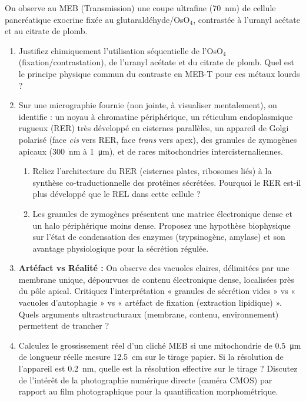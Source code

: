 \documentclass[11pt]{article}
\begin{document}
\begin{exercice}
On observe au MEB (Transmission) une coupe ultrafine (\SI{70}{nm}) de cellule pancréatique exocrine fixée au glutaraldéhyde/OsO$_4$, contrastée à l'uranyl acétate et au citrate de plomb.

\begin{enumerate}
    \item Justifiez chimiquement l'utilisation séquentielle de l'OsO$_4$ (fixation/contrastation), de l'uranyl acétate et du citrate de plomb. Quel est le principe physique commun du contraste en MEB-T pour ces métaux lourds ?
    \item Sur une micrographie fournie (non jointe, à visualiser mentalement), on identifie : un noyau à chromatine périphérique, un réticulum endoplasmique rugueux (RER) très développé en cisternes parallèles, un appareil de Golgi polarisé (face \textit{cis} vers RER, face \textit{trans} vers apex), des granules de zymogènes apicaux (\SI{300}{\nano\meter} à \SI{1}{\micro\meter}), et de rares mitochondries intercisternaliennes.
    \begin{enumerate}
        \item Reliez l'architecture du RER (cisternes plates, ribosomes liés) à la synthèse co-traductionnelle des protéines sécrétées. Pourquoi le RER est-il plus développé que le REL dans cette cellule ?
        \item Les granules de zymogènes présentent une matrice électronique dense et un halo périphérique moins dense. Proposez une hypothèse biophysique sur l'état de condensation des enzymes (trypsinogène, amylase) et son avantage physiologique pour la sécrétion régulée.
    \end{enumerate}
    \item \textbf{Artéfact vs Réalité :} On observe des vacuoles claires, délimitées par une membrane unique, dépourvues de contenu électronique dense, localisées près du pôle apical. Critiquez l'interprétation « granules de sécrétion vides » vs « vacuoles d'autophagie » vs « artéfact de fixation (extraction lipidique) ». Quels arguments ultrastructuraux (membrane, contenu, environnement) permettent de trancher ?
    \item Calculez le grossissement réel d'un cliché MEB si une mitochondrie de \SI{0,5}{\micro\meter} de longueur réelle mesure \SI{12,5}{cm} sur le tirage papier. Si la résolution de l'appareil est \SI{0,2}{nm}, quelle est la résolution effective sur le tirage ? Discutez de l'intérêt de la photographie numérique directe (caméra CMOS) par rapport au film photographique pour la quantification morphométrique.
\end{enumerate}
\end{exercice}
\end{document}
